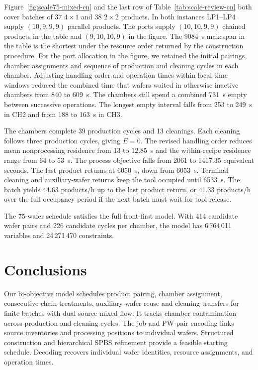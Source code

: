 \documentclass[preprint,12pt,nonatbib]{elsarticle}
\begin{document}
Figure~\ref{fig:scale75-mixed-cn} and the last row of Table~\ref{tab:scale-review-cn} both cover batches of 37 $4\times1$ and 38 $2\times2$ products. In both instances LP1--LP4 supply $(10,9,9,9)$ parallel products. The ports supply $(10,10,9,9)$ chained products in the table and $(9,10,10,9)$ in the figure. The 9084~s makespan in the table is the shortest under the resource order returned by the construction procedure. For the port allocation in the figure, we retained the initial pairings, chamber assignments and sequence of production and cleaning cycles in each chamber. Adjusting handling order and operation times within local time windows reduced the combined time that wafers waited in otherwise inactive chambers from 840 to 609~s. The chambers still spend a combined 731~s empty between successive operations. The longest empty interval falls from 253 to 249~s in CH2 and from 188 to 163~s in CH3.

The chambers complete 39 production cycles and 13 cleanings. Each cleaning follows three production cycles, giving $E=0$. The revised handling order reduces mean nonprocessing residence from 13 to 12.85~s and the within-recipe residence range from 64 to 53~s. The process objective falls from 2061 to 1417.35 equivalent seconds. The last product returns at 6050~s, down from 6053~s. Terminal cleaning and auxiliary-wafer returns keep the tool occupied until 6533~s. The batch yields 44.63 products/h up to the last product return, or 41.33 products/h over the full occupancy period if the next batch must wait for tool release.

The 75-wafer schedule satisfies the full front-first model. With 414 candidate wafer pairs and 226 candidate cycles per chamber, the model has 6\,764\,011 variables and 24\,271\,470 constraints.

\FloatBarrier
\section{Conclusions}
\label{sec:conclusion-cn}

Our bi-objective model schedules product pairing, chamber assignment, consecutive chain treatments, auxiliary-wafer reuse and cleaning transfers for finite batches with dual-source mixed flow. It tracks chamber contamination across production and cleaning cycles. The job and PW-pair encoding links source inventories and processing positions to individual wafers. Structured construction and hierarchical SPBS refinement provide a feasible starting schedule. Decoding recovers individual wafer identities, resource assignments, and operation times.
\end{document}
